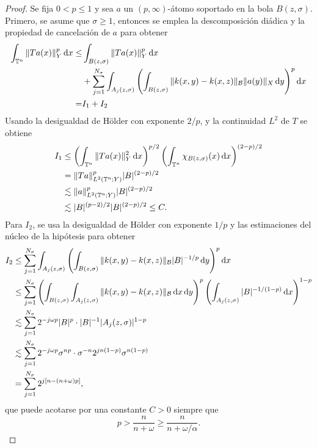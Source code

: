\begin{proof}
	Se fija $0< p \leq1$ y sea $a$ un $(p,\infty)$-átomo soportado en la bola $B(z,\sigma)$. Primero, se asume que $\sigma\geq1$, entonces se emplea la descomposición diádica y la propiedad de cancelación de $a$ para obtener
	\begin{align*}
		\int_{\mathbb{T}^n}\|Ta(x)\|^p_Y \mathop{}\!\mathrm{d} x \leq & \int_{B(z,\sigma)}\|Ta(x)\|^p_Y \mathop{}\!\mathrm{d} x \\ 
		& + \sum_{j=1}^{N_\sigma} \int_{A_j(z,\sigma)}\left( \int_{B(z,\sigma)} \|k(x, y) - k(x, z)\|_\mathcal{B} \|a(y)\|_X 
		\mathop{}\!\mathrm{d} y\right)^p \mathop{}\!\mathrm{d} x \\
		= & I_1 + I_2
	\end{align*}
	Usando la desigualdad de H\"older con exponente $2/p$, y la continuidad $L^2$ de $T$ se obtiene
	\begin{align*}
		I_1  &\leq \left( \int_{\mathbb{T}^n} \|Ta(x)\|_Y^2\mathop{}\!\mathrm{d} x \right)^{p/2}\left( \int_{\mathbb{T}^n} \chi_{B(z,\sigma)}(x)\mathop{}\!\mathrm{d} x \right)^{(2-p)/2} \\
		 & =  \|Ta\|_{L^2(\mathbb{T}^n;Y)}^p|B|^{(2-p)/2} \\
		 &\lesssim \|a\|_{L^2(\mathbb{T}^n;Y)}^p |B|^{(2-p)/2} \\
		 & \lesssim |B|^{(p-2)/2} |B|^{(2-p)/2}\leq C.
	\end{align*}
	Para $I_2$, se usa la desigualdad de H\"older con exponente $1/p$ y las estimaciones del núcleo de la hipótesis para obtener
	\begin{align*}
		I_2  &\leq \sum_{j=1}^{N_\sigma}\int_{A_j(z,\sigma)}\left( \int_{B(z,\sigma)} \|k(x, y) - k(x, z)\|_\mathcal{B} |B|^{-1/p} 
		\mathop{}\!\mathrm{d} y\right)^p \mathop{}\!\mathrm{d} x \\
		 & \leq\sum_{j=1}^{N_\sigma} \left(\int_{B(z,\sigma)} \int_{A_j(z,\sigma)} \|k(x, y) - k(x, z)\|_\mathcal{B} \mathop{}\!\mathrm{d} x\mathop{}\!\mathrm{d} y \right)^p \left( \int_{A_j(z,\sigma)} |B|^{-1/(1-p)} \mathop{}\!\mathrm{d} x \right)^{1-p} \\
		 &\lesssim \sum_{j=1}^{N_\sigma}  2^{-j\omega p}|B|^p \cdot |B|^{-1}|A_j(z, \sigma)|^{1-p} \\
		 &\lesssim \sum_{j=1}^{N_\sigma} 2^{-j\omega p}\sigma^{np} \cdot \sigma^{-n}2^{jn(1-p)}\sigma^{n(1-p)}\\
		 & =\sum_{j=1}^{N_\sigma} 2^{j[n-(n+\omega)p]},
	\end{align*}
	que puede acotarse por una constante $C>0$ siempre que 
	\begin{equation}
		p > \frac{n}{n+\omega} \geq \frac{n}{n+\omega/\alpha}.
		\label{eq:base-p0}
	\end{equation}

\end{proof}
